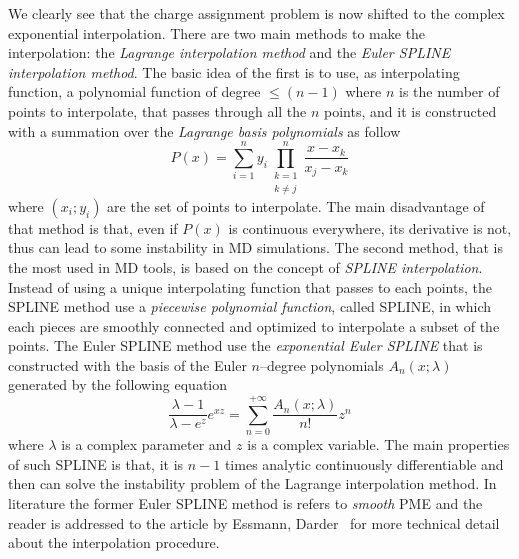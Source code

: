 We clearly see that the charge assignment problem is now shifted to the complex exponential interpolation. There are two main methods to make the interpolation: the \textit{Lagrange interpolation method} and the \textit{Euler SPLINE interpolation method}. The basic idea of the first is to use, as interpolating function, a polynomial function of degree $ \le (n-1)$ where $n$ is the number of points to interpolate, that passes through all the $n$ points, and it is constructed with a summation over the \textit{Lagrange basis polynomials} as follow
\begin{equation*}
	P(x) = \sum_{i=1}^n y_i \prod_{\substack{k=1\\k\ne j}}^n \frac{x-x_k}{x_j - x_k}
\end{equation*}
where $(x_i;y_i)$ are the set of points to interpolate. The main disadvantage of that method is that, even if $P(x)$ is continuous everywhere, its derivative is not, thus can lead to some instability in \ac{MD} simulations. The second method, that is the most used in \ac{MD} tools, is based on the concept of \textit{SPLINE interpolation}. Instead of using a unique interpolating function that passes to each points, the SPLINE method use a \textit{piecewise polynomial function}, called SPLINE, in which each pieces are smoothly connected and optimized to interpolate a subset of the points. The Euler SPLINE method use the \textit{exponential Euler SPLINE} that is constructed with the basis of the Euler $n$--degree polynomials $A_n(x;\lambda)$ generated by the following equation
\begin{equation*}
	\frac{\lambda - 1}{\lambda - e^z}e^{xz} = \sum_{n=0}^{+\infty} \frac{A_n(x;\lambda)}{n!}z^n
\end{equation*}
where $\lambda$ is a complex parameter and $z$ is a complex variable. The main properties of such SPLINE is that, it is $n-1$ times analytic continuously differentiable and then can solve the instability problem of the Lagrange interpolation method. In literature the former Euler SPLINE method is refers to \textit{smooth} \acl{PME} and the reader is addressed to the article by Essmann, Darder \etal\, \cite{EssmannSPME} for more technical detail about the interpolation procedure. 

